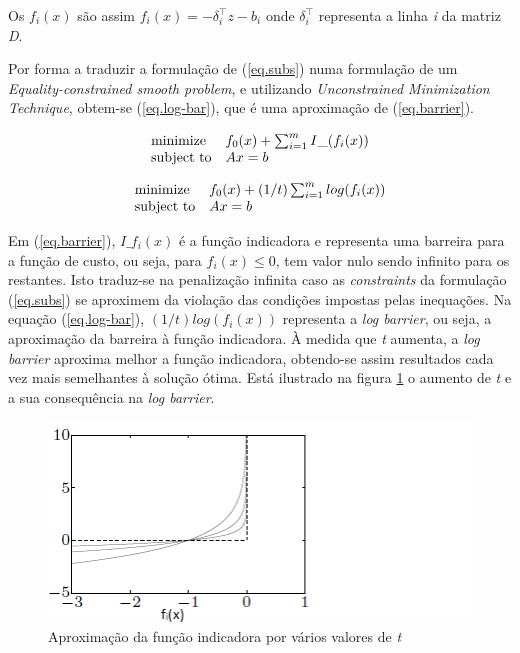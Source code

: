 \documentclass[a4paper]{IEEEtran}
\begin{document}
Os $f_i(x)$ são assim $f_i(x) = -\delta_i^\top z - b_i$ onde $\delta_i^\top$ representa a linha \textit{i} da matriz \textit{D}.

Por forma a traduzir a formulação de (\ref{eq.subs}) numa formulação de um \textit{Equality-constrained smooth problem}, e utilizando \textit{Unconstrained Minimization Technique}, obtem-se (\ref{eq.log-bar}), que é uma aproximação de (\ref{eq.barrier}).

\begin{equation}
\label{eq.barrier}
\begin{array}[t]{ll} \text{minimize} & f_0(x) + \sum_{i=1}^{m} I\_(f_i(x)) \\
\text{subject to} &  Ax=b \end{array}
\end{equation}

\begin{equation}
\label{eq.log-bar}
\begin{array}[t]{ll} \text{minimize} & f_0(x) + (1/t) \sum_{i=1}^{m} log(f_i(x)) \\
\text{subject to} &  Ax=b \end{array}
\end{equation}

Em (\ref{eq.barrier}), $I\_f_i(x)$ é a função indicadora e representa uma barreira para a função de custo, ou seja, para $f_i(x) \leq 0$, tem valor nulo sendo infinito para os restantes. Isto traduz-se na penalização infinita caso as \textit{constraints} da formulação (\ref{eq.subs}) se aproximem da violação das condições impostas pelas inequações. Na equação (\ref{eq.log-bar}), $(1/t) log(f_i(x))$ representa a \textit{log barrier}, ou seja, a aproximação da barreira à função indicadora. À medida que \textit{t} aumenta, a \textit{log barrier} aproxima melhor a função indicadora, obtendo-se assim resultados cada vez mais semelhantes à solução ótima. Está ilustrado na figura \ref{fig:barrier} o aumento de \textit{t} e a sua consequência na \textit{log barrier}.

\begin{figure}[htp]
  \centering
  \captionsetup{font=scriptsize} 
  \includegraphics[width=0.9\columnwidth]{log-barrier.png}
  \caption{Aproximação da função indicadora por vários valores de \textit{t}}
  \label{fig:barrier}
\end{figure}
\end{document}
